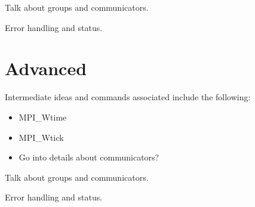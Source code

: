 Talk about groups and communicators.

Error handling and status.

\section{Advanced}

Intermediate ideas and commands associated include the following: \\
\begin{itemize}
\item MPI_Wtime
\item MPI_Wtick
\item Go into details about communicators?
\end{itemize}

Talk about groups and communicators.

Error handling and status.

